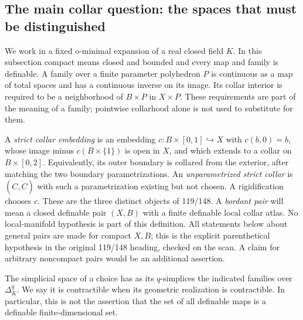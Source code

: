\subsection{The main collar question: the spaces that must be distinguished}

We work in a fixed o-minimal expansion of a real closed field $K$.
In this subsection compact means closed and bounded and every map and family
is definable. A family over a finite parameter polyhedron $P$ is continuous
as a map of total spaces and has a continuous inverse on its image.
Its collar interior is required to be a neighborhood of $B\times P$ in
$X\times P$. These requirements are part of the meaning of a family;
pointwise collarhood alone is not used to substitute for them.

A \emph{strict collar embedding} is an embedding
$c:B\times[0,1]\hookrightarrow X$ with $c(b,0)=b$, whose image minus
$c(B\times\{1\})$ is open in $X$, and which extends to a collar on
$B\times[0,2]$. Equivalently, its outer boundary is collared from the
exterior, after matching the two boundary parametrizations. An
\emph{unparametrized strict collar} is $(C,\dot C)$ with such a
parametrization existing but not chosen. A rigidification chooses $c$.
These are the three distinct objects of 119/148. A \emph{bordant pair}
will mean a closed definable pair $(X,B)$ with a finite definable local
collar atlas. No local-manifold hypothesis is part of this definition.
All statements below about general pairs are made for compact $X,B$;
this is the explicit parenthetical hypothesis in the original 119/148
heading, checked on the scan. A claim for arbitrary noncompact pairs
would be an additional assertion.

The simplicial space of a choice has as its $q$-simplices the indicated
families over $\Delta^q_K$. We say it is contractible when its geometric
realization is contractible. In particular, this is not the assertion
that the set of all definable maps is a definable finite-dimensional set.

